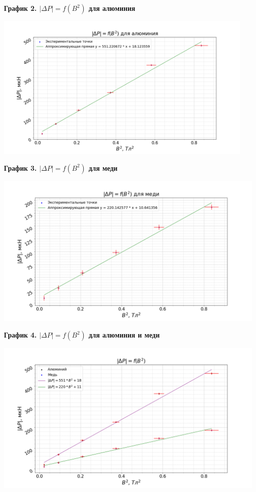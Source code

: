 \documentclass[15pt,a5paper,reqno]{article}
\begin{document}
    \noindent\hypertarget{graph_al}{\textbf{График 2. $|\Delta P| = f(B^2)$ для алюминия}}
    \begin{center}
        \includegraphics[width = 0.95\textwidth]{images/al.png}
    \end{center}

    \noindent\hypertarget{graph_cu}{\textbf{График 3. $|\Delta P| = f(B^2)$ для меди}}
    \begin{center}
        \includegraphics[width = \textwidth]{images/cu.png}
    \end{center}

    \noindent\hypertarget{graph_mix}{\textbf{График 4. $|\Delta P| = f(B^2)$ для алюминия и меди}}
    \begin{center}
        \includegraphics[width = \textwidth]{images/mix.png}
    \end{center}
\end{document}
